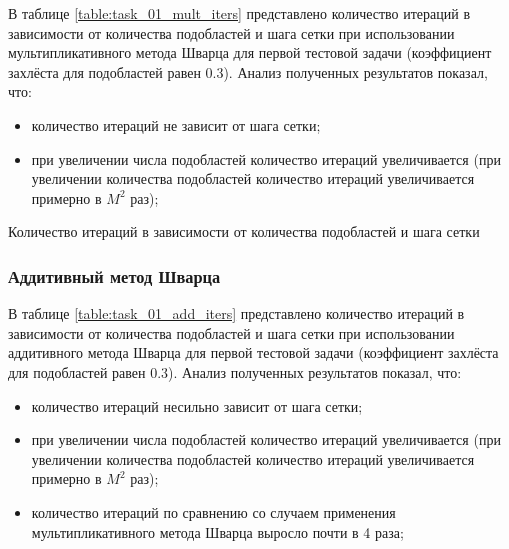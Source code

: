 \documentclass[a4paper]{article}
\begin{document}
В таблице \ref{table:task_01_mult_iters} представлено количество итераций в зависимости от количества подобластей и шага сетки при использовании мультипликативного метода Шварца для первой тестовой задачи (коэффициент захлёста для подобластей равен 0.3). Анализ полученных результатов показал, что:
\begin{itemize}
\item количество итераций не зависит от шага сетки;
\item при увеличении числа подобластей количество итераций увеличивается (при увеличении количества подобластей количество итераций увеличивается примерно в $M^2$ раз);
\end{itemize}

\begin{table}[h]
\caption{Количество итераций в зависимости от количества подобластей и шага сетки}
\label{table:task_01_mult_iters}
\end{table}

\newpage

\subsubsection{Аддитивный метод Шварца}

В таблице \ref{table:task_01_add_iters} представлено количество итераций в зависимости от количества подобластей и шага сетки при использовании аддитивного метода Шварца для первой тестовой задачи (коэффициент захлёста для подобластей равен 0.3). Анализ полученных результатов показал, что:
\begin{itemize}
\item количество итераций несильно зависит от шага сетки;
\item при увеличении числа подобластей количество итераций увеличивается (при увеличении количества подобластей количество итераций увеличивается примерно в $M^2$ раз);
\item количество итераций по сравнению со случаем применения мультипликативного метода Шварца выросло почти в 4 раза;
\end{itemize}
\end{document}
